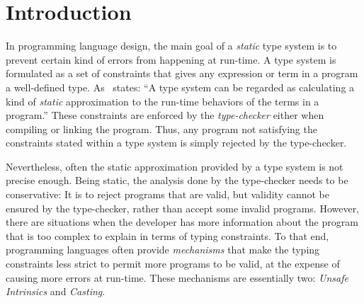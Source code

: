 
\chapter{Introduction}

In programming language design, the main goal of a \emph{static} type system is to prevent certain kind of errors from happening at run-time.
A type system is formulated as a set of constraints that gives any expression or term in a program a well-defined type.
As~\cite{pierceTypesProgrammingLanguages2002} states: ``A type system can be regarded as calculating a kind of \emph{static} approximation to the run-time behaviors of the terms in a program.''
These constraints are enforced by the \emph{type-checker} either when compiling or linking the program.
Thus, any program not satisfying the constraints stated within a type system is simply rejected by the type-checker.

Nevertheless, often the static approximation provided by a type system is not precise enough.
Being static, the analysis done by the type-checker needs to be conservative:
It is
to reject programs that are valid, but
validity cannot be ensured by the type-checker,
rather than accept some invalid programs.
However, there are situations when the developer has more information
about the program that is too complex to explain in terms of
typing constraints.
To that end, programming languages often provide \emph{mechanisms} that 
make the typing constraints less strict
to permit more programs to be valid,
at the expense of causing more errors at run-time.
These mechanisms are essentially two:
\emph{Unsafe Intrinsics} and \emph{Casting}.

